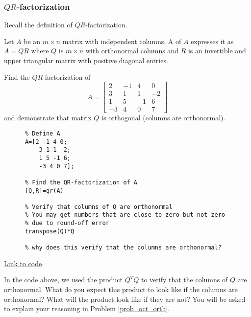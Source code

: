 \documentclass{ximera}
\begin{document}
\subsubsection*{$QR$-factorization}

Recall the definition of $QR$-factorization.
\begin{definition}[\ref{def:QR-factorization}]
Let $A$ be an $m \times n$ matrix with independent columns. A  of $A$ expresses it as $A = QR$ where $Q$ is $m \times n$ with orthonormal columns and $R$ is an invertible and upper triangular matrix with positive diagonal entries.
\end{definition}

\begin{example}\label{ex:qrOrthonormalQ}
Find the $QR$-factorization of 
$$A=\begin{bmatrix}2 & -1 & 4 & 0\\
    3 & 1 & 1 & -2\\
    1 & 5 & -1 & 6\\
    -3 & 4 & 0 & 7\end{bmatrix}$$
and demonstrate that matrix $Q$ is orthogonal (columns are orthonormal).     
\begin{explanation}
    \begin{verbatim}
      % Define A
      A=[2 -1 4 0;
          3 1 1 -2;
          1 5 -1 6;
          -3 4 0 7];
      
      % Find the QR-factorization of A
      [Q,R]=qr(A)
      
      % Verify that columns of Q are orthonormal
      % You may get numbers that are close to zero but not zero
      % due to round-off error
      transpose(Q)*Q

      % why does this verify that the columns are orthonormal?
    \end{verbatim}
  
\href{https://sagecell.sagemath.org/?z=eJxdj8tqwzAQRfcG_8PdBJJSQZ30sSihGEr3yqJQQhaKPaoFtqYdSy3O11eKUyiVVpc5Z7izwDNZ5wl1WdTb_Rqqwi1uHssC6W1Qpa_Wl1jhLs_vL1FtMoqHQ8plscCL8y1CR9A7ZU0TWNzJBMcebPP-vb7eHbafsqxXs_BK4uyUFBPQcB8HP2ZUwwiBJXTsWQbTZ_aNIwYz4Z0CfByOJOMsZrbpeSQExomEcYwJ4XAOWW3jeSYcfavYWpAIS1kEMX78SOZSr670XOm7m9Ay5d1uxNefgvmw35L_-j39ACBmYSg=&lang=octave&interacts=eJyLjgUAARUAuQ==}{Link to code}.
\end{explanation}  

\begin{question}
In the code above, we used the product $Q^TQ$ to verify that the columns of $Q$ are orthonormal.  What do you expect this product to look like if the columns are orthonormal?  What will the product look like if they are not?  You will be asked to explain your reasoning in Problem \ref{prob_oct_orth}.
\end{question}

\end{example}
\end{document}
